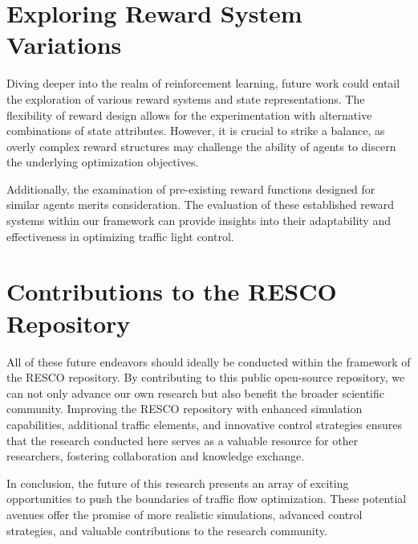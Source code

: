 \section{Exploring Reward System Variations}
Diving deeper into the realm of reinforcement learning, future work could entail the exploration of various reward systems and state representations. The flexibility of reward design allows for the experimentation with alternative combinations of state attributes. However, it is crucial to strike a balance, as overly complex reward structures may challenge the ability of agents to discern the underlying optimization objectives.

Additionally, the examination of pre-existing reward functions designed for similar agents merits consideration. The evaluation of these established reward systems within our framework can provide insights into their adaptability and effectiveness in optimizing traffic light control.

\section{Contributions to the RESCO Repository}
All of these future endeavors should ideally be conducted within the framework of the RESCO repository. By contributing to this public open-source repository, we can not only advance our own research but also benefit the broader scientific community. Improving the RESCO repository with enhanced simulation capabilities, additional traffic elements, and innovative control strategies ensures that the research conducted here serves as a valuable resource for other researchers, fostering collaboration and knowledge exchange.

In conclusion, the future of this research presents an array of exciting opportunities to push the boundaries of traffic flow optimization. These potential avenues offer the promise of more realistic simulations, advanced control strategies, and valuable contributions to the research community.
